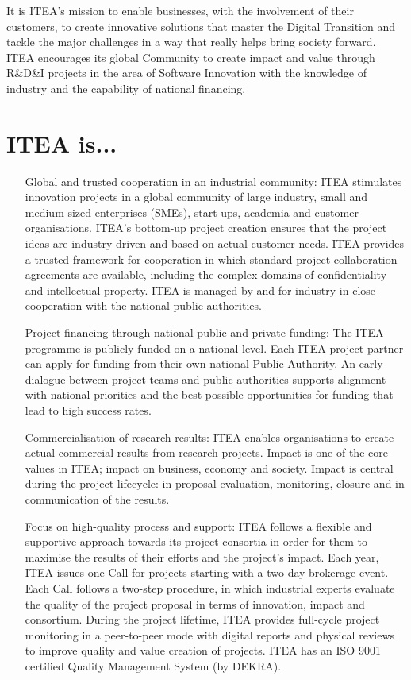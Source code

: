 It is ITEA’s mission to enable businesses, with the involvement of their customers, to create innovative solutions that master the Digital Transition and tackle the major challenges in a way that really helps bring society forward. ITEA encourages its global Community to create impact and value through R\&D\&I projects in the area of Software Innovation with the knowledge of industry and the capability of national financing.

\section{ITEA is...}

\begin{itemize}
    \item[Global and trusted cooperation in an industrial community:]
    ITEA stimulates innovation projects in a global community of large industry, small and medium-sized enterprises (SMEs), start-ups, academia and customer organisations. ITEA’s bottom-up project creation ensures that the project ideas are industry-driven and based on actual customer needs. ITEA provides a trusted framework for cooperation in which standard project collaboration agreements are available, including the complex domains of confidentiality and intellectual property. ITEA is managed by and for industry in close cooperation with the national public authorities.
    
    \item[Project financing through national public and private funding:]
    The ITEA programme is publicly funded on a national level. Each ITEA project partner can apply for funding from their own national Public Authority. An early dialogue between project teams and public authorities supports alignment with national priorities and the best possible opportunities for funding that lead to high success rates.
    
    \item[Commercialisation of research results:]
    ITEA enables organisations to create actual commercial results from research projects. Impact is one of the core values in ITEA; impact on business, economy and society. Impact is central during the project lifecycle: in proposal evaluation, monitoring, closure and in communication of the results.
    
    \item[Focus on high-quality process and support:]
    ITEA follows a flexible and supportive approach towards its project consortia in order for them to maximise the results of their efforts and the project’s impact. Each year, ITEA issues one Call for projects starting with a two-day brokerage event. Each Call follows a two-step procedure, in which industrial experts evaluate the quality of the project proposal in terms of innovation, impact and consortium. During the project lifetime, ITEA provides full-cycle project monitoring in a peer-to-peer mode with digital reports and physical reviews to improve quality and value creation of projects. ITEA has an ISO 9001 certified Quality Management System (by DEKRA).

\end{itemize}